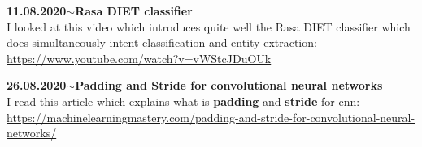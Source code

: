 \documentclass[11pt,a4paper]{article}
\newenvironment{loggentry}[2]%
{\noindent\textbf{#1}\hspace{1cm}$\mathbf{\sim}$\text{ }\textbf{#2}\\}{\vspace{0.5cm}}
\begin{document}
\begin{loggentry}{11.08.2020}{Rasa DIET classifier}

I looked at this video which introduces quite well the Rasa DIET classifier which does simultaneously intent classification and entity extraction:\\
\url{https://www.youtube.com/watch?v=vWStcJDuOUk}

\end{loggentry}


\begin{loggentry}{26.08.2020}{Padding and Stride for convolutional neural networks}

I read this article which explains what is \textbf{padding} and \textbf{stride} for cnn:\\
\url{https://machinelearningmastery.com/padding-and-stride-for-convolutional-neural-networks/}

\end{loggentry}
\end{document}
